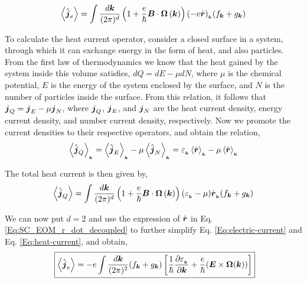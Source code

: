 \documentclass{report}
\renewcommand\vec[1]{\ensuremath\boldsymbol{#1}} %
\begin{document}
\begin{equation} \label{Eq:electric-current}
	\expval{\hat{\vec{j}}_e} = \int \frac{d\vec{k}}{(2\pi)^d} \left(1 + \frac{e}{\hbar} \vec{B} \cdot  \vec{\Omega}\left(\vec{k}\right)\right) (- e \dot{\vec{r}})_{_{\vec{k}}} ({f}_{\vec{k}} + {g}_{\vec{k}})
\end{equation}

To calculate the heat current operator, consider a closed surface in a system, through which it can exchange energy in the form of heat, and also particles. From the first law of thermodynamics we know that the heat gained by the system inside this volume satisfies, $dQ = dE - \mu dN$, where $\mu$ is the chemical potential, $E$ is the energy of the system enclosed by the surface, and $N$ is the number of particles inside the surface. From this relation, it follows that $\vec{j}_Q = \vec{j}_E - \mu \vec{j}_N$, where $\vec{j}_Q$, $\vec{j}_E$, and $\vec{j}_N$ are the heat current density, energy current density, and number current density, respectively. Now we promote the current densities to their respective operators, and obtain the relation,
\begin{equation} 
	\expval{\hat{\vec{j}}_Q}_{_{\vec{k}}} = \expval{\hat{\vec{j}}_E}_{_{\vec{k}}} - \mu \expval{\hat{\vec{j}}_N}_{_{\vec{k}}} = \varepsilon_{_{\vec{k}}} \expval{\dot{\vec{r}}}_{_{\vec{k}}} - \mu \expval{\dot{\vec{r}}}_{_{\vec{k}}}
\end{equation}

The total heat current is then given by,
\begin{equation} \label{Eq:heat-current}
	\expval{\hat{\vec{j}}_Q} = \int \frac{d\vec{k}}{(2\pi)^d} \left(1 + \frac{e}{\hbar} \vec{B} \cdot  \vec{\Omega}\left(\vec{k}\right)\right) (\varepsilon_{_{\vec{k}}} - \mu) \dot{\vec{r}}_{_{\vec{k}}} ({f}_{\vec{k}} + {g}_{\vec{k}})
\end{equation}

We can now put $d = 2$ and use the expression of $\dot{\vec{r}}$ in Eq. \eqref{Eq:SC_EOM_r_dot_decoupled} to further simplify Eq. \eqref{Eq:electric-current} and Eq. \eqref{Eq:heat-current}, and obtain,
\begin{equation}~\label{Eq:electric-current-simplified}
	\boxed{\expval{\hat{\vec{j}}_e} = -e \int \frac{d\vec{k}}{(2\pi)^2} ({f}_{\vec{k}} + {g}_{\vec{k}}) \left[\frac{1}{\hbar} \frac{\partial \varepsilon_{_{\vec{k}}}}{\partial \vec{k}} + \frac{e}{\hbar} (\vec{E}\times\vec{\Omega}(\vec{k}))\right]}
\end{equation}
\end{document}
